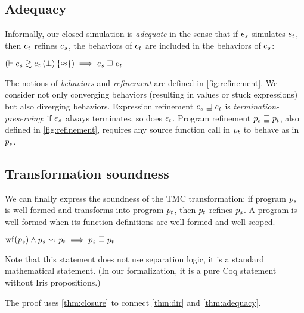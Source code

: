 \subsection{Adequacy}



Informally, our closed simulation is \emph{adequate} in the sense that if $\datalangExpr_s$ simulates $\datalangExpr_t$, then $\datalangExpr_t$ refines $\datalangExpr_s$, \ie the behaviors of $\datalangExpr_t$ are included in the behaviors of $\datalangExpr_s$:

\begin{theorem} \label{thm:adequacy}
    $
        \left( \vdash \iSimv[\bot]{\iSimilar}{\datalangExpr_s}{\datalangExpr_t} \right) \implies
        \datalangExpr_s \refined \datalangExpr_t
    $
\end{theorem}

The notions of \emph{behaviors} and \emph{refinement} are defined in \cref{fig:refinement}.
We consider not only converging behaviors (resulting in values or stuck expressions) but also diverging behaviors.
Expression refinement $\datalangExpr_s \refined \datalangExpr_t$ is \emph{termination-preserving}: if $\datalangExpr_s$ always terminates, so does $\datalangExpr_t$.
Program refinement $\datalangProg_s \refined \datalangProg_t$, also defined in \cref{fig:refinement}, requires any source function call in $\datalangProg_t$ to behave as in $\datalangProg_s$.

\subsection{Transformation soundness}

We can finally express the soundness of the TMC transformation: if program $\datalangProg_s$ is well-formed and transforms into program $\datalangProg_t$, then $\datalangProg_t$ refines $\datalangProg_s$.
A program is well-formed when its function definitions are well-formed and well-scoped.

\begin{theorem} \label{thm:soundness}
    $
        \wf{\datalangProg_s} \wedge \datalangProg_s \tmc \datalangProg_t \implies
        \datalangProg_s \refined \datalangProg_t
    $
\end{theorem}
Note that this statement does not use separation logic, it is a standard mathematical statement. (In our formalization, it is a pure Coq statement without Iris propositions.)

The proof uses \cref{thm:closure} to connect \cref{thm:dir} and \cref{thm:adequacy}.

